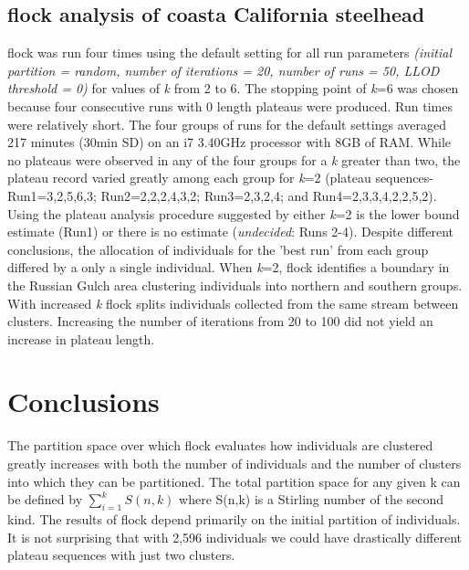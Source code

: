 \subsection*{{\sc flock} analysis of coasta California steelhead} 
{\sc flock} was run four times using the default setting for all run parameters \textit{(initial partition = random, number of iterations = 20, number of runs = 50, LLOD threshold = 0)} for values of \textit{k} from 2 to 6. The stopping point of \textit{k}=6 was chosen because four consecutive runs with 0 length plateaus were produced. 
Run times were relatively short. The four groups of runs for the default settings averaged 217 minutes (30min SD) on an i7 3.40GHz processor with 8GB of RAM. While no plateaus were observed in any of the four groups for a \textit{k} greater than two, the plateau record varied greatly among each group for \textit{k}=2 (plateau sequences- Run1=3,2,5,6,3; Run2=2,2,2,4,3,2; Run3=2,3,2,4; and Run4=2,3,3,4,2,2,5,2). Using the plateau analysis procedure suggested by \citet{Duc&Tur2012} either \textit{k}=2 is the lower bound estimate (Run1) or there is no estimate (\textit{undecided}: Runs 2-4). Despite different conclusions, the allocation of individuals for the 'best run' from each group differed by a only a single individual. When \textit{k}=2, {\sc flock} identifies a boundary in the Russian Gulch area clustering individuals into northern and southern groups. With increased \textit{k} {\sc flock} splits individuals collected from the same stream between clusters. Increasing the number of iterations from 20 to 100 did not yield an increase in plateau length. 


\section*{Conclusions}
The partition space over which {\sc flock} evaluates how individuals are clustered greatly increases with both the number of individuals and the number of clusters into which they can be partitioned. The total partition space for any given k can be defined by $\sum\limits_{i=1}^k S(n,k)$ where S(n,k) is a Stirling number of the second kind. The results of {\sc flock} depend primarily on the initial partition of individuals. It is not surprising that with 2,596 individuals we could have drastically different plateau sequences with just two clusters. 
